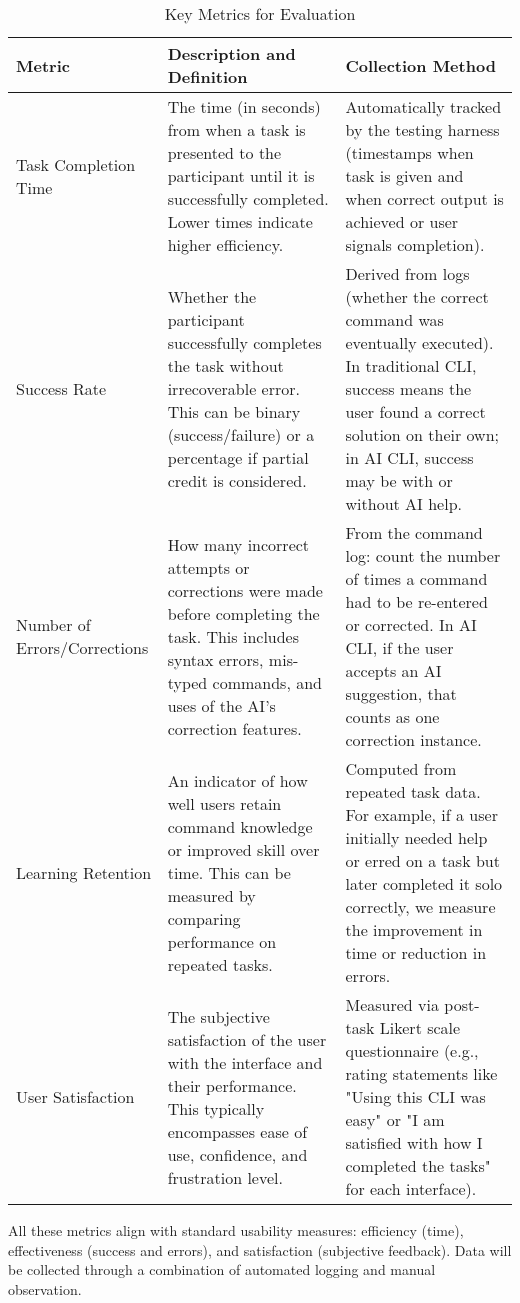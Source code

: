 \begin{table}[h]
	\centering
	\begin{tabular}{|p{3cm}|p{5cm}|p{4cm}|}
		\hline
		\textbf{Metric}              & \textbf{Description and Definition}                                                                                                                                         & \textbf{Collection Method}                                                                                                                                                                                    \\
		\hline
		Task Completion Time         & The time (in seconds) from when a task is presented to the participant until it is successfully completed. Lower times indicate higher efficiency.                          & Automatically tracked by the testing harness (timestamps when task is given and when correct output is achieved or user signals completion).                                                                  \\
		\hline
		Success Rate                 & Whether the participant successfully completes the task without irrecoverable error. This can be binary (success/failure) or a percentage if partial credit is considered.  & Derived from logs (whether the correct command was eventually executed). In traditional CLI, success means the user found a correct solution on their own; in AI CLI, success may be with or without AI help. \\
		\hline
		Number of Errors/Corrections & How many incorrect attempts or corrections were made before completing the task. This includes syntax errors, mis-typed commands, and uses of the AI's correction features. & From the command log: count the number of times a command had to be re-entered or corrected. In AI CLI, if the user accepts an AI suggestion, that counts as one correction instance.                         \\
		\hline
		Learning Retention           & An indicator of how well users retain command knowledge or improved skill over time. This can be measured by comparing performance on repeated tasks.                       & Computed from repeated task data. For example, if a user initially needed help or erred on a task but later completed it solo correctly, we measure the improvement in time or reduction in errors.           \\
		\hline
		User Satisfaction            & The subjective satisfaction of the user with the interface and their performance. This typically encompasses ease of use, confidence, and frustration level.                & Measured via post-task Likert scale questionnaire (e.g., rating statements like "Using this CLI was easy" or "I am satisfied with how I completed the tasks" for each interface).                             \\
		\hline
	\end{tabular}
	\caption{Key Metrics for Evaluation}
	\label{tab:metrics}
\end{table}

All these metrics align with standard usability measures: efficiency (time), effectiveness (success and errors), and satisfaction (subjective feedback). Data will be collected through a combination of automated logging and manual observation.
